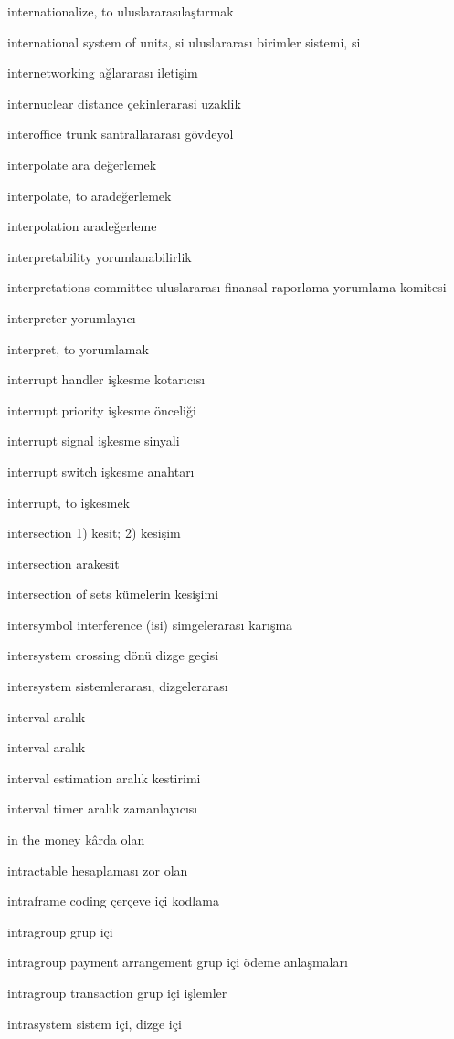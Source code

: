 \documentclass[12pt,fleqn]{article}\usepackage{../../common}
\begin{document}
internationalize, to uluslararasılaştırmak

international system of units, si uluslararası birimler sistemi, si

internetworking ağlararası iletişim

internuclear distance çekinlerarasi uzaklik

interoffice trunk santrallararası gövdeyol

interpolate ara değerlemek

interpolate, to aradeğerlemek

interpolation aradeğerleme

interpretability yorumlanabilirlik

interpretations committee uluslararası finansal raporlama yorumlama komitesi

interpreter yorumlayıcı

interpret, to yorumlamak

interrupt handler işkesme kotarıcısı

interrupt priority işkesme önceliği

interrupt signal işkesme sinyali

interrupt switch işkesme anahtarı

interrupt, to işkesmek

intersection 1) kesit; 2) kesişim

intersection arakesit

intersection of sets kümelerin kesişimi

intersymbol interference (isi) simgelerarası karışma

intersystem crossing dönü dizge geçisi

intersystem sistemlerarası, dizgelerarası

interval aralık

interval aralık

interval estimation aralık kestirimi

interval timer aralık zamanlayıcısı

in the money kârda olan

intractable hesaplaması zor olan

intraframe coding çerçeve içi kodlama

intragroup grup içi

intragroup payment arrangement grup içi ödeme anlaşmaları

intragroup transaction grup içi işlemler

intrasystem sistem içi, dizge içi
\end{document}
